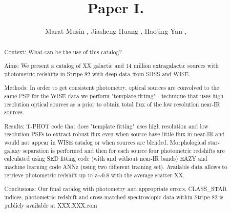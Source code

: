 \documentclass[apj,iop]{emulateapj}
\begin{document}

\title{Paper I. 
}
\author{Marat Musin , Jiasheng Huang ,
Haojing Yan , 
}




\begin{abstract}
Context: What can be the use of this catalog?

Aims: We present a catalog of XX galactic and 14 million extragalactic sources with photometric redshifts in Stripe 82 with deep data from SDSS and WISE. 

Methods: In order to get consistent photometry, optical sources are convolved to the same PSF for the WISE data we perform "template fitting" - technique that uses high resolution optical sources as a prior to obtain total flux of the low resolution near-IR sources.

Results: T-PHOT code that does "template fitting" uses high resolution and low resolution PSFs to extract robust flux even when source have little flux in near-IR and would not appear in WISE catalog or when sources are blended. Morphological star-galaxy separation is performed and then for each source four photometric redshifts are  calculated using SED fitting code (with and without near-IR bands) EAZY and machine learning code ANNz (using two different training set). Available data allows to retrieve photometric redshift up to z$\sim$0.8  with the average scatter XX.

Conclusions: Our final catalog with photometry and appropriate errors, CLASS\_STAR indices, photometric redshift and cross-matched spectroscopic data within Stripe 82 is publicly available at XXX.XXX.com

\end{abstract}

\end{document}
